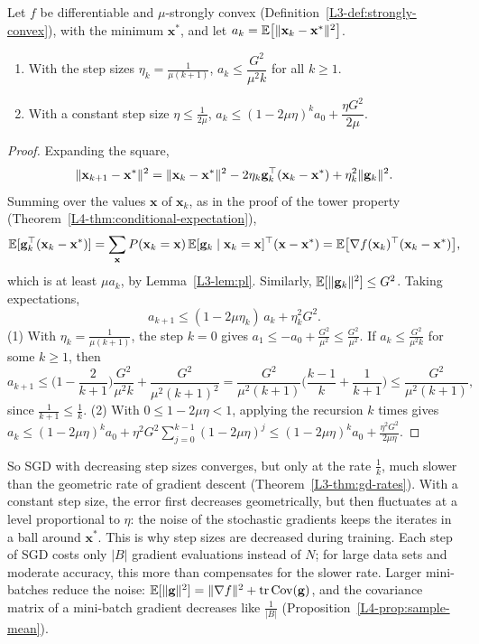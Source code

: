\begin{theorem}\label{L4-thm:sgd}
    Let $f$ be differentiable and $\mu$-strongly convex (Definition~\ref{L3-def:strongly-convex}), with the minimum $\mathbf{x}^*$, and let $a_k = \mathbb{E}\big[\lVert \mathbf{x}_k - \mathbf{x}^* \rVert^2\big]$.
    \begin{enumerate}
        \item With the step sizes $\eta_k = \frac{1}{\mu(k + 1)}$, $a_k \leq \dfrac{G^2}{\mu^2k}$ for all $k \geq 1$.
        \item With a constant step size $\eta \leq \frac{1}{2\mu}$, $a_k \leq (1 - 2\mu\eta)^ka_0 + \dfrac{\eta G^2}{2\mu}$.
    \end{enumerate}
\end{theorem}

\begin{proof}
    Expanding the square,
    \[\lVert \mathbf{x}_{k+1} - \mathbf{x}^* \rVert^2 = \lVert \mathbf{x}_k - \mathbf{x}^* \rVert^2 - 2\eta_k\mathbf{g}_k^\top(\mathbf{x}_k - \mathbf{x}^*) + \eta_k^2\lVert \mathbf{g}_k \rVert^2.\]
    Summing over the values $\mathbf{x}$ of $\mathbf{x}_k$, as in the proof of the tower property (Theorem~\ref{L4-thm:conditional-expectation}),
    \[\mathbb{E}[\mathbf{g}_k^\top(\mathbf{x}_k - \mathbf{x}^*)] = \sum_{\mathbf{x}} P(\mathbf{x}_k = \mathbf{x})\,\mathbb{E}[\mathbf{g}_k \mid \mathbf{x}_k = \mathbf{x}]^\top(\mathbf{x} - \mathbf{x}^*) = \mathbb{E}\big[\nabla f(\mathbf{x}_k)^\top(\mathbf{x}_k - \mathbf{x}^*)\big],\]
    which is at least $\mu a_k$, by Lemma~\ref{L3-lem:pl}. Similarly, $\mathbb{E}[\lVert \mathbf{g}_k \rVert^2] \leq G^2$. Taking expectations,
    \[a_{k+1} \leq (1 - 2\mu\eta_k)\,a_k + \eta_k^2G^2.\]
    (1) With $\eta_k = \frac{1}{\mu(k + 1)}$, the step $k = 0$ gives $a_1 \leq -a_0 + \frac{G^2}{\mu^2} \leq \frac{G^2}{\mu^2}$. If $a_k \leq \frac{G^2}{\mu^2k}$ for some $k \geq 1$, then
    \[a_{k+1} \leq \Big(1 - \frac{2}{k + 1}\Big)\frac{G^2}{\mu^2k} + \frac{G^2}{\mu^2(k + 1)^2} = \frac{G^2}{\mu^2(k + 1)}\Big(\frac{k - 1}{k} + \frac{1}{k + 1}\Big) \leq \frac{G^2}{\mu^2(k + 1)},\]
    since $\frac{1}{k + 1} \leq \frac{1}{k}$. (2) With $0 \leq 1 - 2\mu\eta < 1$, applying the recursion $k$ times gives $a_k \leq (1 - 2\mu\eta)^ka_0 + \eta^2G^2\sum_{j=0}^{k-1}(1 - 2\mu\eta)^j \leq (1 - 2\mu\eta)^ka_0 + \frac{\eta^2G^2}{2\mu\eta}$.
\end{proof}

So SGD with decreasing step sizes converges, but only at the rate $\frac{1}{k}$, much slower than the geometric rate of gradient descent (Theorem~\ref{L3-thm:gd-rates}). With a constant step size, the error first decreases geometrically, but then fluctuates at a level proportional to $\eta$: the noise of the stochastic gradients keeps the iterates in a ball around $\mathbf{x}^*$. This is why step sizes are decreased during training. Each step of SGD costs only $|B|$ gradient evaluations instead of $N$; for large data sets and moderate accuracy, this more than compensates for the slower rate. Larger mini-batches reduce the noise: $\mathbb{E}[\lVert \mathbf{g} \rVert^2] = \lVert \nabla f \rVert^2 + \operatorname{tr}\operatorname{Cov}(\mathbf{g})$, and the covariance matrix of a mini-batch gradient decreases like $\frac{1}{|B|}$ (Proposition~\ref{L4-prop:sample-mean}).

